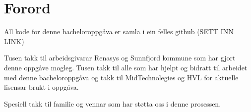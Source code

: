 \chapter{Forord}
\thispagestyle{romanpages}
All kode for denne bacheloroppgåva er samla i ein felles github (SETT INN LINK)

Tusen takk til arbeidsgivarar Renasys og Sunnfjord kommune som har gjort denne oppgåve mogleg.
Tusen takk til alle som har hjelpt og bidratt til arbeidet med denne bacheloroppgåva og
takk til MidTechnolegies og HVL for aktuelle lisensar brukt i oppgåva.

Spesiell takk til familie og vennar som har støtta oss i denne prosessen.
